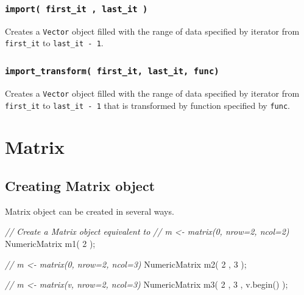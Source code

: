 \documentclass[]{book}
\newenvironment{Shaded}{\begin{snugshade}}{\end{snugshade}}
\newcommand{\CommentTok}[1]{\textcolor[rgb]{0.56,0.35,0.01}{\textit{#1}}}
\newcommand{\DecValTok}[1]{\textcolor[rgb]{0.00,0.00,0.81}{#1}}
\newcommand{\NormalTok}[1]{#1}
\begin{document}
\hypertarget{import-first_it-last_it}{%
\subsection{\texorpdfstring{\texttt{import(\ first\_it\ ,\ last\_it\ )}}{import( first\_it , last\_it )}}\label{import-first_it-last_it}}

Creates a \texttt{Vector} object filled with the range of data specified by iterator from \texttt{first\_it} to \texttt{last\_it\ -\ 1}.

\hypertarget{import_transform-first_it-last_it-func}{%
\subsection{\texorpdfstring{\texttt{import\_transform(\ first\_it,\ last\_it,\ func)}}{import\_transform( first\_it, last\_it, func)}}\label{import_transform-first_it-last_it-func}}

Creates a \texttt{Vector} object filled with the range of data specified by iterator from \texttt{first\_it} to \texttt{last\_it\ -\ 1} that is transformed by function specified by \texttt{func}.

\hypertarget{matrix}{%
\chapter{Matrix}\label{matrix}}

\hypertarget{creating-matrix-object}{%
\section{Creating Matrix object}\label{creating-matrix-object}}

Matrix object can be created in several ways.

\begin{Shaded}
\begin{Highlighting}[]
\CommentTok{// Create a Matrix object equivalent to}
\CommentTok{// m <- matrix(0, nrow=2, ncol=2)}
\NormalTok{NumericMatrix m1( }\DecValTok{2}\NormalTok{ );}

\CommentTok{// m <- matrix(0, nrow=2, ncol=3)}
\NormalTok{NumericMatrix m2( }\DecValTok{2}\NormalTok{ , }\DecValTok{3}\NormalTok{ );}

\CommentTok{// m <- matrix(v, nrow=2, ncol=3)}
\NormalTok{NumericMatrix m3( }\DecValTok{2}\NormalTok{ , }\DecValTok{3}\NormalTok{ , v.begin() );}
\end{Highlighting}
\end{Shaded}
\end{document}
